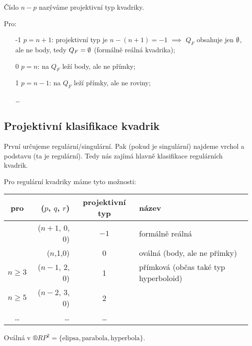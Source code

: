 \documentclass[12pt]{article}					%
\begin{document}
\begin{definice}
	Číslo $n - p$ nazýváme projektivní typ kvadriky.
\end{definice}

\begin{priklady}
	Pro:
	\begin{itemize}
		\item[-1] $p = n+1$: projektivní typ je $n - (n+1) = -1$ $\implies$ $Q_F$ obsahuje jen $\emptyset$, ale ne body, tedy $Q_F = \emptyset$ (formálně reálná kvadrika);
		\item[0] $p = n$: na $Q_F$ leží body, ale ne přímky;
		\item[1] $p = n-1$: na $Q_F$ leží přímky, ale ne roviny;
		\item[\ldots]
	\end{itemize}
\end{priklady}

\subsection{Projektivní klasifikace kvadrik}
\begin{poznamka}
	První určujeme regulární/singulární. Pak (pokud je singulární) najdeme vrchol a podstavu (ta je regulární). Tedy nás zajímá hlavně klasifikace regulárních kvadrik.
\end{poznamka}

\begin{definice}
	Pro regulární kvadriky máme tyto možnosti:
	\begin{tabular}{cr|cl}
		pro     & ($p$, $q$, $r$) & projektivní typ & název                                 \\ \hline
        		& ($n+1$, 0, 0)   & $-1$            & formálně reálná                       \\
		        & ($n$,1,0)       & 0               & oválná (body, ale ne přímky)          \\
		$n ≥ 3$ & ($n-1$, 2, 0)   & 1               & přímková (občas také typ hyperboloid) \\
		$n ≥ 5$ & ($n-2$, 3, 0)   & 2               &                                       \\
		…       & …               & …               &
	\end{tabular}
\end{definice}

\begin{poznamka}
	Oválná v $®RP^2 = \{\text{elipsa}, \text{parabola}, \text{hyperbola}\}$.
\end{poznamka}
\end{document}
